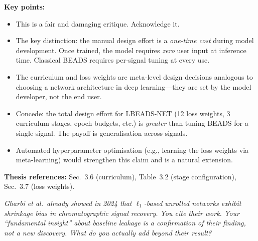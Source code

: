 \documentclass[11pt, letterpaper]{article}
\newcounter{qcounter}
\newcommand{\question}[1]{%
  \stepcounter{qcounter}%
  \begin{questionbox}[Q\theqcounter]%
    \itshape #1%
  \end{questionbox}%
}
\begin{document}
\begin{answerbox}
\textbf{Key points:}
\begin{itemize}[nosep]
  \item This is a fair and damaging critique.  Acknowledge it.
  \item The key distinction: the manual design effort is a
        \emph{one-time cost} during model development.  Once trained,
        the model requires \emph{zero} user input at inference time.
        Classical BEADS requires per-signal tuning at every use.
  \item The curriculum and loss weights are meta-level design
        decisions analogous to choosing a network architecture in
        deep learning---they are set by the model developer, not
        the end user.
  \item Concede: the total design effort for LBEADS-NET (12 loss
        weights, 3 curriculum stages, epoch budgets, etc.) is
        \emph{greater} than tuning BEADS for a single signal.  The
        payoff is generalisation across signals.
  \item Automated hyperparameter optimisation (e.g., learning the
        loss weights via meta-learning) would strengthen this claim
        and is a natural extension.
\end{itemize}
\textbf{Thesis references:} Sec.~3.6 (curriculum), Table~3.2 (stage configuration), Sec.~3.7 (loss weights).
\end{answerbox}

\question{Gharbi et al.\ already showed in 2024 that $\ell_1$-based
unrolled networks exhibit shrinkage bias in chromatographic
signal recovery.  You cite their work.  Your ``fundamental insight''
about baseline leakage is a confirmation of their finding, not a
new discovery.  What do you actually add beyond their result?}
\end{document}
